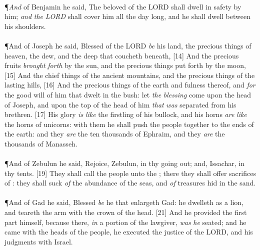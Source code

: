 \\
\P \textcolor[cmyk]{0.99998,1,0,0}{\emph{And} of Benjamin he said, The beloved of the LORD shall dwell in safety by him; \emph{and} \emph{the} \emph{LORD} shall cover him all the day long, and he shall dwell between his shoulders.}\\
\\
\P \textcolor[cmyk]{0.99998,1,0,0}{And of Joseph he said, Blessed of the LORD \emph{be} his land,  the precious things of heaven,  the dew, and  the deep that coucheth beneath,}
[14] \textcolor[cmyk]{0.99998,1,0,0}{And  the precious fruits \emph{brought} \emph{forth} by the sun, and  the precious things put forth by the moon,}
[15] \textcolor[cmyk]{0.99998,1,0,0}{And  the chief things of the ancient mountains, and  the precious things of the lasting hills,}
[16] \textcolor[cmyk]{0.99998,1,0,0}{And  the precious things of the earth and fulness thereof, and \emph{for} the good will of him that dwelt in the bush: let \emph{the} \emph{blessing} come upon the head of Joseph, and upon the top of the head of him \emph{that} \emph{was} separated from his brethren.}
[17] \textcolor[cmyk]{0.99998,1,0,0}{His glory \emph{is} \emph{like} the firstling of his bullock, and his horns \emph{are} \emph{like} the horns of unicorns: with them he shall push the people together to the ends of the earth: and they \emph{are} the ten thousands of Ephraim, and they \emph{are} the thousands of Manasseh.}\\
\\
\P \textcolor[cmyk]{0.99998,1,0,0}{And of Zebulun he said, Rejoice, Zebulun, in thy going out; and, Issachar, in thy tents.}
[19] \textcolor[cmyk]{0.99998,1,0,0}{They shall call the people unto the ; there they shall offer sacrifices of :  they shall suck \emph{of} the abundance of the seas, and \emph{of} treasures hid in the sand.}\\
\\
\P \textcolor[cmyk]{0.99998,1,0,0}{And of Gad he said, Blessed \emph{be} he that enlargeth Gad: he dwelleth as a lion, and teareth the arm with the crown of the head.}
[21] \textcolor[cmyk]{0.99998,1,0,0}{And he provided the first part  himself, because there, \emph{in} a portion of the lawgiver, \emph{was} \emph{he} seated; and he came with the heads of the people, he executed the justice of the LORD, and his judgments with Israel.}\\
